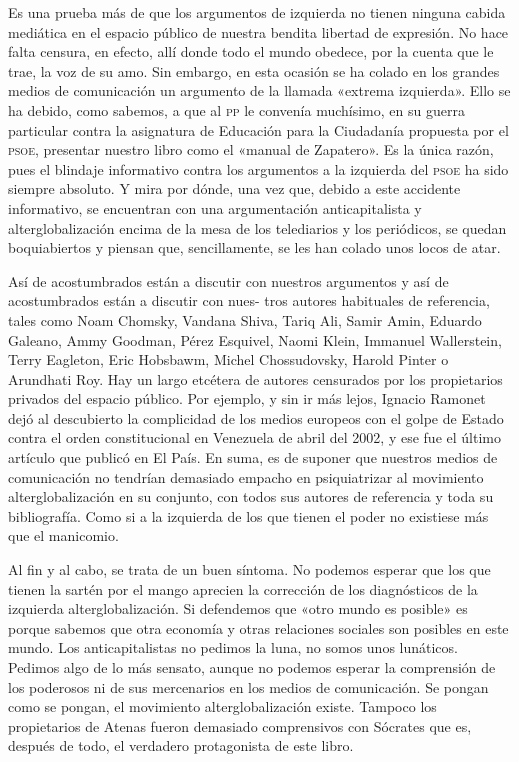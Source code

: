 \documentclass[draft,9pt,letterpaper,twocolumn,openany]{extbook}
\begin{document}
Es una prueba
más de que los argumentos de izquierda no tienen ninguna cabida mediática en el
espacio público de nuestra bendita libertad de expresión. No hace falta censura,
en efecto, allí donde todo el mundo obedece, por la cuenta que le trae, la voz de
su amo. Sin embargo, en esta ocasión se ha colado en los grandes medios de comunicación un argumento de la llamada «extrema izquierda». Ello se ha debido,
como sabemos, a que al \textsc{pp} le convenía muchísimo, en su guerra particular contra la asignatura de Educación para la Ciudadanía propuesta por el \textsc{psoe}, presentar nuestro libro como el «manual de Zapatero». Es la única razón, pues el blindaje
informativo contra los argumentos a la izquierda del \textsc{psoe} ha sido siempre absoluto. Y mira por dónde, una vez que, debido a este accidente informativo, se encuentran con una argumentación anticapitalista y alterglobalización encima de la mesa
de los telediarios y los periódicos, se quedan boquiabiertos y piensan que, sencillamente, se les han colado unos locos de atar. 

Así de acostumbrados están a discutir con nuestros argumentos y así de acostumbrados están a discutir con nues-
tros autores habituales de referencia, tales como Noam Chomsky, Vandana Shiva,
        Tariq Ali, Samir Amin, Eduardo Galeano, Ammy Goodman, Pérez Esquivel, Naomi
Klein, Immanuel Wallerstein, Terry Eagleton, Eric Hobsbawm, Michel Chossudovsky,
Harold Pinter o Arundhati Roy. Hay un largo etcétera de autores censurados por los
propietarios privados del espacio público. Por ejemplo, y sin ir más lejos, Ignacio
Ramonet dejó al descubierto la complicidad de los medios europeos con el golpe
de Estado contra el orden constitucional en Venezuela de abril del 2002, y ese fue
el último artículo que publicó en El País. En suma, es de suponer que nuestros medios de comunicación no tendrían demasiado empacho en psiquiatrizar al movimiento alterglobalización en su conjunto, con todos sus autores de referencia y
toda su bibliografía. Como si a la izquierda de los que tienen el poder no existiese más que el manicomio.

Al fin y al cabo, se trata de un buen síntoma. No podemos esperar que los que
tienen la sartén por el mango aprecien la corrección de los diagnósticos de la izquierda alterglobalización. Si defendemos que «otro mundo es posible» es porque
sabemos que otra economía y otras relaciones sociales son posibles en este mundo. Los anticapitalistas no pedimos la luna, no somos unos lunáticos. Pedimos
algo de lo más sensato, aunque no podemos esperar la comprensión de los poderosos ni de sus mercenarios en los medios de comunicación.
Se pongan como se pongan, el movimiento alterglobalización existe. Tampoco
los propietarios de Atenas fueron demasiado comprensivos con Sócrates que es,
después de todo, el verdadero protagonista de este libro.
\end{document}
